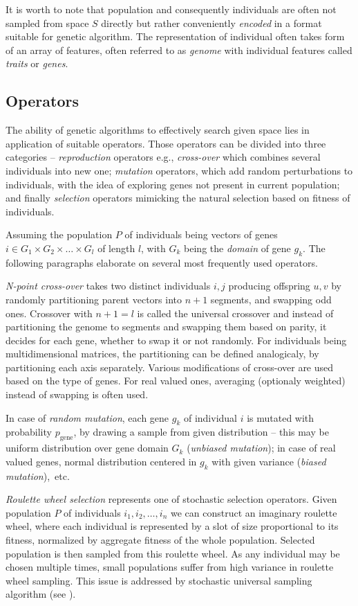 It is worth to note that population and consequently individuals are often not sampled from space $S$ directly but rather conveniently \emph{encoded} in a format suitable for genetic algorithm. The representation of individual often takes form of an array of features, often referred to as \emph{genome} with individual features called \emph{traits} or \emph{genes}.

\subsection{Operators}
The ability of genetic algorithms to effectively search given space lies in application of suitable operators. Those operators can be divided into three categories -- \emph{reproduction} operators e.g., \emph{cross-over} which combines several individuals into new one; \emph{mutation} operators, which add random perturbations to individuals, with the idea of exploring genes not present in current population; and finally \emph{selection} operators mimicking the natural selection based on fitness of individuals.

Assuming the population $P$ of individuals being vectors of genes $i \in G_1 \times G_2 \times \dots \times G_l$ of length $l$, with $G_k$ being the \emph{domain} of gene $g_k$. The following paragraphs elaborate on several most frequently used operators.

\emph{N-point cross-over} takes two distinct individuals $i, j$ producing offspring $u, v$ by randomly partitioning parent vectors into $n+1$ segments, and swapping odd ones. Crossover with $n + 1 = l$ is called the universal crossover and instead of partitioning the genome to segments and swapping them based on parity, it decides for each gene, whether to swap it or not randomly. For individuals being multidimensional matrices, the partitioning can be defined analogicaly, by partitioning each axis separately. Various modifications of cross-over are used based on the type of genes. For real valued ones, averaging (optionaly weighted) instead of swapping is often used.

In case of \emph{random mutation}, each gene $g_k$ of individual $i$ is mutated with probability $p_{\text{gene}}$, by drawing a sample from given distribution -- this may be uniform distribution over gene domain $G_k$ (\emph{unbiased mutation}); in case of real valued genes, normal distribution centered in $g_k$ with given variance (\emph{biased mutation}),~etc.

\emph{Roulette wheel selection} represents one of stochastic selection operators. Given population $P$ of individuals $i_1, i_2, \dots, i_n$ we can construct an imaginary roulette wheel, where each individual is represented by a slot of size proportional to its fitness, normalized by aggregate fitness of the whole population. Selected population is then sampled from this roulette wheel. As any individual may be chosen multiple times, small populations suffer from high variance in roulette wheel sampling. This issue is addressed by stochastic universal sampling algorithm (see \cite{evolution}).

